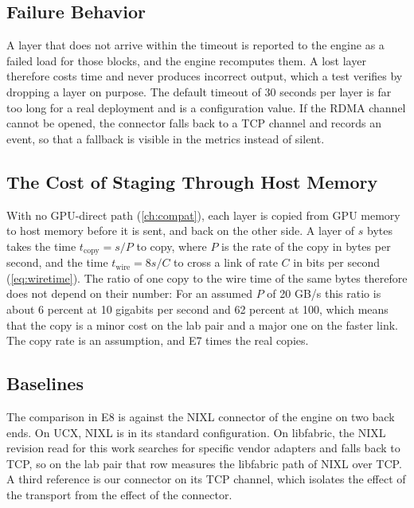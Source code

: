 \subsection{Failure Behavior}

A layer that does not arrive within the timeout is reported to the engine as
a failed load for those blocks, and the engine recomputes them. A lost layer
therefore costs time and never produces incorrect output, which a test
verifies by dropping a layer on purpose. The default timeout of 30 seconds
per layer is far too long for a real deployment and is a configuration value.
If the RDMA channel cannot be opened, the connector falls back to a TCP
channel and records an event, so that a fallback is visible in the metrics
instead of silent.

\subsection{The Cost of Staging Through Host Memory}

With no GPU-direct path (\cref{ch:compat}), each layer is copied from GPU
memory to host memory before it is sent, and back on the other side. A layer
of $s$ bytes takes the time $t_{\text{copy}} = s / P$ to copy, where $P$ is
the rate of the copy in bytes per second, and the time
$t_{\text{wire}} = 8 s / C$ to cross a link of rate $C$ in bits per second
(\cref{eq:wiretime}). The ratio of one copy to the wire time of the same
bytes therefore does not depend on their number:
For an assumed $P$ of 20 GB/s this ratio is about 6 percent at 10 gigabits
per second and 62 percent at 100, which means that the copy is a minor cost
on the lab pair and a major one on the faster link. The copy rate is an
assumption, and E7 times the real copies.

\subsection{Baselines}

The comparison in E8 is against the NIXL connector of the engine on two back
ends. On UCX, NIXL is in its standard configuration. On libfabric, the NIXL
revision read for this work searches for specific vendor adapters and falls
back to TCP, so on the lab pair that row measures the libfabric path of NIXL
over TCP. A third reference is our connector on its TCP channel, which
isolates the effect of the transport from the effect of the connector.

